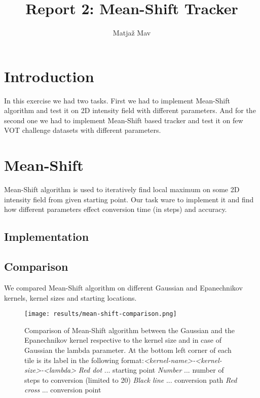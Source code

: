 \documentclass[runningheads]{llncs}
\begin{document}
% 
\title{Report 2: Mean-Shift Tracker}
\author{Matjaž Mav}
%
\maketitle              %
%
 
\section{Introduction}
In this exercise we had two tasks. First we had to implement Mean-Shift algorithm and test it on 2D intensity field with different parameters. And for the second one we had to implement Mean-Shift based tracker and test it on few VOT challenge datasets with different parameters.

\section{Mean-Shift}
Mean-Shift algorithm is used to iteratively find local maximum on some 2D intensity field from given starting point. Our task ware to implement it and find how different parameters effect conversion time (in steps) and accuracy.

\subsection{Implementation}
\subsection{Comparison}
We compared Mean-Shift algorithm on different Gaussian and Epanechnikov kernels, kernel sizes and starting locations.

\begin{figure}
    \centering
    \texttt{[image: results/mean-shift-comparison.png]}
    \caption{Comparison of Mean-Shift algorithm between the Gaussian and the Epanechnikov kernel respective to the kernel size and in case of Gaussian the lambda parameter. At the bottom left corner of each tile is its label in the following format:\newline \textit{\textless kernel-name\textgreater-\textless kernel-size\textgreater-\textless lambda\textgreater}
    \newline \textit{Red dot} ... starting point
    \newline \textit{Number} ... number of steps to conversion (limited to 20)
    \newline \textit{Black line} ... conversion path
    \newline \textit{Red cross} ... conversion point}
    \label{img_meanshift}
\end{figure}
\end{document}
